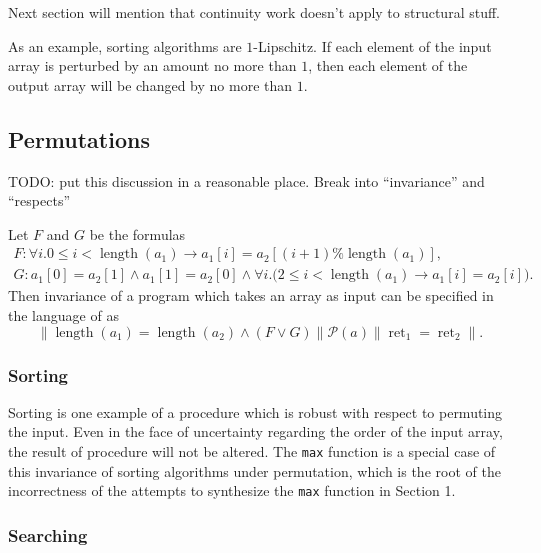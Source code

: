 \documentclass{llncs}
\DeclareMathOperator{\Perm}{Perm}
\DeclareMathOperator{\len}{length}
\DeclareMathOperator{\ret}{ret}
\begin{document}
    Next section will mention that continuity work doesn't apply to structural
    stuff.

    As an example, sorting algorithms are
    \(1\)-Lipschitz.  If each element of the input array is perturbed by an amount
    no more than \(1\), then each element of the output array will be changed by no
    more than \(1\).

  \subsection{Permutations}


    TODO: put this discussion in a reasonable place.
    Break into ``invariance'' and ``respects''

    Let \(F\) and \(G\) be the formulas
    \begin{gather*}
        F:  \forall i. 0 \leq i < \len(a_{1}) \rightarrow a_{1}[i] = a_{2}[(i+1)\%\len(a_{1})],\\
            G: a_{1}[0] = a_{2}[1] \wedge a_{1}[1] = a_{2}[0] \wedge 
              \forall i.\big( 2 \leq i < \len(a_{1}) \rightarrow a_{1}[i] = a_{2}[i] \big).
    \end{gather*}
    Then invariance of a program which takes an array as input can be specified
    in the language of \cite{sousa16} as
    \[
      \|\len(a_{1}) = \len(a_{2}) \wedge (F \vee G)\| 
        \mathcal{P}(a) \|\ret_{1} = \ret_{2}\|.
    \]

  \subsubsection{Sorting}

    Sorting is one example of a procedure which is robust with respect to permuting
    the input.  Even in the face of uncertainty regarding the order of the input
    array, the result of procedure will not be altered.  The \verb!max! function is
    a special case of this invariance of sorting algorithms under permutation, which
    is the root of the incorrectness of the attempts to synthesize the \verb!max!
    function in Section 1.

  \subsubsection{Searching}
\end{document}
